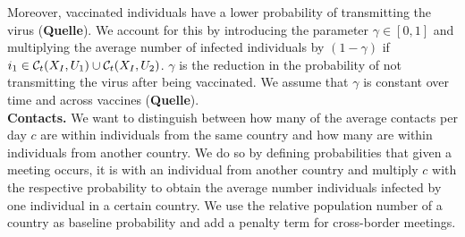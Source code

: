 Moreover, vaccinated individuals have a lower probability of transmitting the virus (\textbf{Quelle}). We account for this by introducing the parameter $\gamma \in [0,1]$ and multiplying the average number of infected individuals by $(1 - \gamma)$ if $i_1 \in \mathcal{C}_t(X_I, U_1) \cup \mathcal{C}_t(X_I, U_2)$. $\gamma$ is the reduction in the probability of not transmitting the virus after being vaccinated. We assume that $\gamma$ is constant over time and across vaccines (\textbf{Quelle}). \\

\textbf{Contacts.}
We want to distinguish between how many of the average contacts per day $c$ are within individuals from the same country and how many are within individuals from another country. We do so by defining probabilities that given a meeting occurs, it is with an individual from another country and multiply $c$ with the respective probability to obtain the average number individuals infected by one individual in a certain country. We use the relative population number of a country as baseline probability and add a penalty term for cross-border meetings. 

